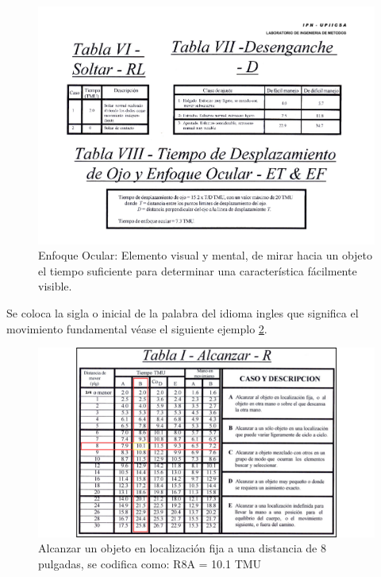     \begin{figure}[H]
       \centering
        \includegraphics[scale=0.3]{15/img/tabla8TiempoDesplazamientoOjo.pdf}
        \caption{Enfoque Ocular: Elemento visual y mental, de mirar hacia un objeto el tiempo suficiente para determinar una característica fácilmente visible.}
        \label{fig:tabla8TiepoDesplazamientoOjo}
    \end{figure}
    
    Se coloca la sigla o inicial de la palabra del idioma ingles que significa el movimiento fundamental véase el siguiente ejemplo \ref{fig:tabla1AlcanzarEjemplo}.
    
    \begin{figure}[H]
       \centering
        \includegraphics[scale=0.19]{15/img/tabla1AlcanzarEjemplo.pdf}
        \caption{Alcanzar un objeto en localización fija a una distancia de 8 pulgadas, se codifica como: R8A = 10.1 TMU}
        \label{fig:tabla1AlcanzarEjemplo}
    \end{figure}
    
